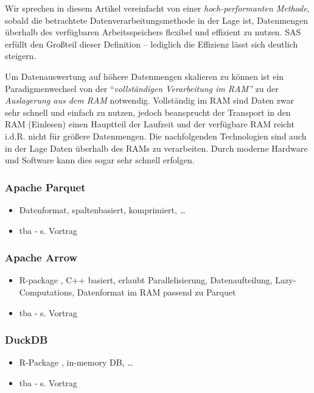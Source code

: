 \documentclass[
  german,
  10pt,
  twoside]{article}
\providecommand{\tightlist}{%
  \setlength{\itemsep}{0pt}\setlength{\parskip}{0pt}}
\begin{document}
Wir sprechen in diesem Artikel vereinfacht von einer
\emph{hoch-performanten Methode}, sobald die betrachtete
Datenverarbeitungsmethode in der Lage ist, Datenmengen überhalb des
verfügbaren Arbeitsspeichers flexibel und effizient zu nutzen. SAS
erfüllt den Großteil dieser Definition -- lediglich die Effizienz lässt
sich deutlich steigern.

Um Datenauswertung auf höhere Datenmengen skalieren zu können ist ein
Paradigmenwechsel von der ``\emph{vollständigen Verarbeitung im RAM''}
zu der \emph{Auslagerung aus dem RAM} notwendig. Vollständig im RAM sind
Daten zwar sehr schnell und einfach zu nutzen, jedoch beansprucht der
Transport in den RAM (Einlesen) einen Hauptteil der Laufzeit und der
verfügbare RAM reicht i.d.R. nicht für größere Datenmengen. Die
nachfolgenden Technologien sind auch in der Lage Daten überhalb des RAMs
zu verarbeiten. Durch moderne Hardware und Software kann dies sogar sehr
schnell erfolgen.

\subsubsection{Apache Parquet}\label{apache-parquet}

\begin{itemize}
\tightlist
\item
  Datenformat, spaltenbasiert, komprimiert, \ldots{}
\item
  tba - s. Vortrag
\end{itemize}

\subsubsection{Apache Arrow}\label{apache-arrow}

\begin{itemize}
\tightlist
\item
  R-package \autocite{R-arrow}, C++ basiert, erlaubt Parallelisierung,
  Datenaufteilung, Lazy-Computations, Datenformat im RAM passend zu
  Parquet
\item
  tba - s. Vortrag
\end{itemize}

\subsubsection{DuckDB}\label{duckdb}

\begin{itemize}
\tightlist
\item
  R-Package \autocite{R-duckdb}, in-memory DB, \ldots{}
\item
  tba - s. Vortrag
\end{itemize}
\end{document}
